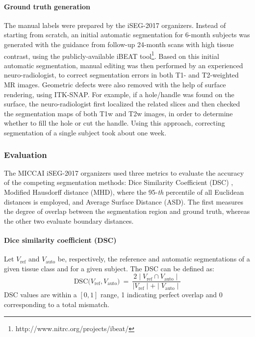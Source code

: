 \documentclass[twoside,espcrc2]{elsarticle}
\newcommand{\mr}[1]{\mathrm{#1}}
\begin{document}
\paragraph{Ground truth generation}

The manual labels were prepared by the iSEG-2017 organizers. Instead of starting from scratch, an initial automatic segmentation for 6-month subjects \cite{wang2013longitudinally,wang20124d} was generated with the guidance from follow-up 24-month scans with high tissue contrast, using the publicly-available iBEAT tool\footnote{http://www.nitrc.org/projects/ibeat/}. Based on this initial automatic segmentation, manual editing was then performed by an experienced neuro-radiologist, to correct segmentation errors in both T1- and T2-weighted MR images. Geometric defects were also removed with the help of surface rendering, using ITK-SNAP. For example, if a hole/handle was found on the surface, the neuro-radiologist first localized the related slices and then checked the segmentation maps of both T1w and T2w images, in order to determine whether to fill the hole or cut the handle. Using this approach, correcting segmentation of a single subject took about one week.





\subsubsection{Evaluation}
\label{sssec:evaluation}

The MICCAI iSEG-2017 organizers used three metrics to evaluate the accuracy of the competing segmentation methods: Dice Similarity Coefficient (DSC) \cite{dice1945measures}, Modified Hausdorff distance (MHD), where the 95-\textit{th} percentile of all Euclidean distances is employed, and Average Surface Distance (ASD). The first measures the degree of overlap between the segmentation region and ground truth, whereas the other two evaluate boundary distances. 

\paragraph{Dice similarity coefficient (DSC)}

Let $V_\mr{ref}$ and $V_\mr{auto}$ be, respectively, the reference and automatic segmentations of a given tissue class and for a given subject. The DSC can be defined as:
\begin{equation}
\mr{DSC}\big(V_\mr{ref}, V_\mr{auto} \big) \ = \ 
    \frac{2 \mid V_\mr{ref} \cap V_\mr{auto}\mid} {\mid V_\mr{ref}\mid +\mid V_\mr{auto}\mid}
\end{equation}
DSC values are within a $[0,1]$ range, 1 indicating perfect overlap and 0 corresponding to a total mismatch.
\end{document}

